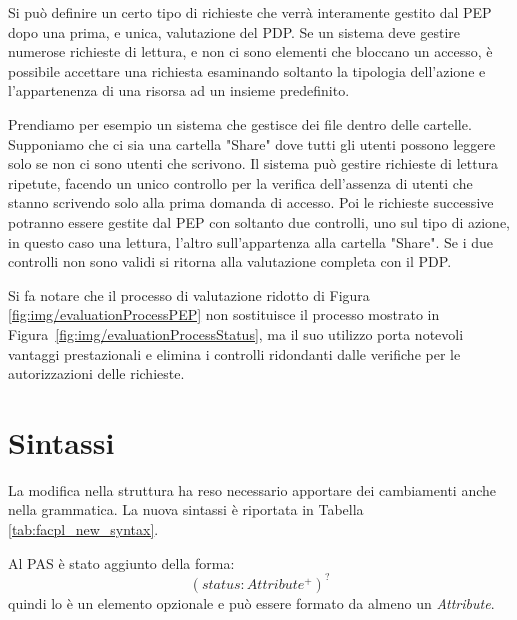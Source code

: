 Si può definire un certo tipo di richieste che verrà interamente gestito dal \ac{PEP} dopo una prima, e unica,
valutazione del \ac{PDP}. Se un sistema deve gestire numerose richieste di lettura, e non ci sono elementi che bloccano
un accesso, è possibile accettare una richiesta esaminando soltanto la tipologia dell'azione e l'appartenenza di una risorsa ad
un insieme predefinito.\par
Prendiamo per esempio un sistema che gestisce dei file dentro delle cartelle. Supponiamo che ci sia una cartella
"Share" dove tutti gli utenti possono leggere solo se non ci sono utenti che scrivono.
Il sistema può gestire richieste di lettura ripetute, facendo un unico controllo per la verifica dell'assenza di
utenti che stanno scrivendo solo alla prima domanda di accesso. Poi le richieste successive potranno essere
gestite dal \ac{PEP} con soltanto due controlli, uno sul tipo di azione, in questo caso una lettura, l'altro sull'appartenza
alla cartella "Share". Se i due controlli non sono validi si ritorna alla valutazione completa con il \ac{PDP}.\par
Si fa notare che il processo di valutazione ridotto di Figura \ref{fig:img/evaluationProcessPEP} non sostituisce il
processo mostrato in Figura~\ref{fig:img/evaluationProcessStatus},
ma il suo utilizzo porta notevoli vantaggi prestazionali e elimina i controlli ridondanti dalle verifiche
per le autorizzazioni delle richieste.
\section{Sintassi}
\label{sec:SintassiNew}
La modifica nella struttura ha reso necessario apportare dei cambiamenti anche nella grammatica.
La nuova sintassi è riportata in Tabella \ref{tab:facpl_new_syntax}.\par
Al \ac{PAS} è stato aggiunto \status della forma:
$$(status: Attribute^+)^?$$
quindi lo \status è un elemento opzionale e può essere formato da almeno un \emph{ Attribute}.


